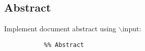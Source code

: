
\clearpage
\newpage
\subsection{Abstract}

Implement document abstract using $\backslash$input:
\begin{verbatim}
           %% Abstract
\end{verbatim}

